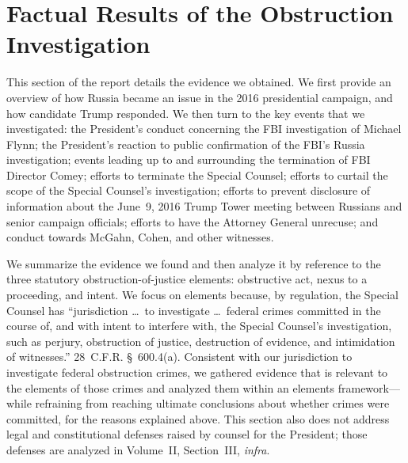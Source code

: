 \section{Factual Results of the Obstruction Investigation}

This section of the report details the evidence we obtained.
We first provide an overview of how Russia became an issue in the 2016 presidential campaign, and how candidate Trump responded.
We then turn to the key events that we investigated: the President's conduct concerning the FBI investigation of Michael Flynn;
the President's reaction to public confirmation of the FBI's Russia investigation; events leading up to and surrounding the termination of FBI Director Comey;
efforts to terminate the Special Counsel; efforts to curtail the scope of the Special Counsel's investigation;
efforts to prevent disclosure of information about the June~9, 2016 Trump Tower meeting between Russians and senior campaign officials; efforts to have the Attorney General unrecuse;
and conduct towards McGahn, Cohen, and other witnesses.

We summarize the evidence we found and then analyze it by reference to the three statutory obstruction-of-justice elements: obstructive act, nexus to a proceeding, and intent.
We focus on elements because, by regulation, the Special Counsel has ``jurisdiction \dots\ to investigate \dots\ federal crimes committed in the course of, and with intent to interfere with, the Special Counsel's investigation, such as perjury, obstruction of justice, destruction of evidence, and intimidation of witnesses.''
28~C.F.R. \S~600.4(a).
Consistent with our jurisdiction to investigate federal obstruction crimes, we gathered evidence that is relevant to the elements of those crimes and analyzed them within an elements framework---while refraining from reaching ultimate conclusions about whether crimes were committed, for the reasons explained above.
This section also does not address legal and constitutional defenses raised by counsel for the President; those defenses are analyzed in Volume~II, Section~III, \textit{infra}.

